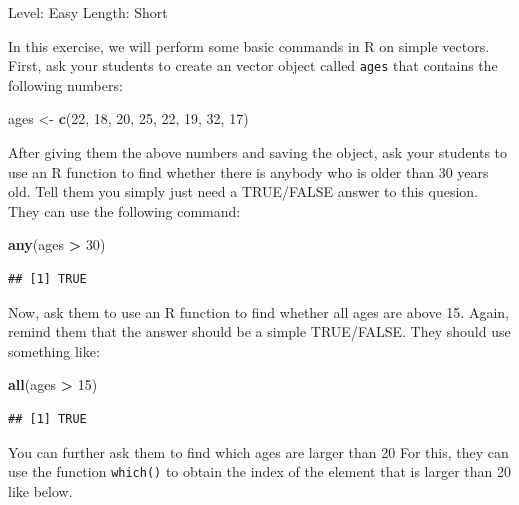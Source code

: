\documentclass[]{book}
\newenvironment{Shaded}{\begin{snugshade}}{\end{snugshade}}
\newcommand{\DecValTok}[1]{\textcolor[rgb]{0.00,0.00,0.81}{#1}}
\newcommand{\KeywordTok}[1]{\textcolor[rgb]{0.13,0.29,0.53}{\textbf{#1}}}
\newcommand{\NormalTok}[1]{#1}
\newcommand{\OperatorTok}[1]{\textcolor[rgb]{0.81,0.36,0.00}{\textbf{#1}}}
\newcommand{\StringTok}[1]{\textcolor[rgb]{0.31,0.60,0.02}{#1}}
\begin{document}
Level: Easy
Length: Short

In this exercise, we will perform some basic commands in R on simple vectors. First, ask your students to create an vector object called \texttt{ages} that contains the following numbers:

\begin{Shaded}
\begin{Highlighting}[]
\NormalTok{ages <-}\StringTok{ }\KeywordTok{c}\NormalTok{(}\DecValTok{22}\NormalTok{, }\DecValTok{18}\NormalTok{, }\DecValTok{20}\NormalTok{, }\DecValTok{25}\NormalTok{, }\DecValTok{22}\NormalTok{, }\DecValTok{19}\NormalTok{, }\DecValTok{32}\NormalTok{, }\DecValTok{17}\NormalTok{)}
\end{Highlighting}
\end{Shaded}

After giving them the above numbers and saving the object, ask your students to use an R function to find whether there is anybody who is older than 30 years old. Tell them you simply just need a TRUE/FALSE answer to this quesion. They can use the following command:

\begin{Shaded}
\begin{Highlighting}[]
\KeywordTok{any}\NormalTok{(ages }\OperatorTok{>}\StringTok{ }\DecValTok{30}\NormalTok{)}
\end{Highlighting}
\end{Shaded}

\begin{verbatim}
## [1] TRUE
\end{verbatim}

Now, ask them to use an R function to find whether all ages are above 15. Again, remind them that the answer should be a simple TRUE/FALSE. They should use something like:

\begin{Shaded}
\begin{Highlighting}[]
\KeywordTok{all}\NormalTok{(ages }\OperatorTok{>}\StringTok{ }\DecValTok{15}\NormalTok{)}
\end{Highlighting}
\end{Shaded}

\begin{verbatim}
## [1] TRUE
\end{verbatim}

You can further ask them to find which ages are larger than 20 For this, they can use the function \texttt{which()} to obtain the index of the element that is larger than 20 like below.
\end{document}
